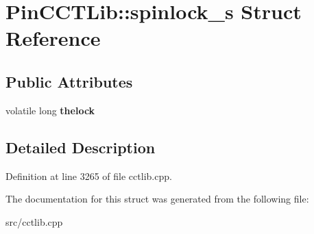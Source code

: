 \hypertarget{structPinCCTLib_1_1spinlock__s}{\section{Pin\-C\-C\-T\-Lib\-:\-:spinlock\-\_\-s Struct Reference}
\label{structPinCCTLib_1_1spinlock__s}
}
\subsection*{Public Attributes}
\begin{DoxyCompactItemize}
\item 
\hypertarget{structPinCCTLib_1_1spinlock__s_a936f0a8cd1abcbadaef8a69755c107bd}{volatile long {\bfseries thelock}}\label{structPinCCTLib_1_1spinlock__s_a936f0a8cd1abcbadaef8a69755c107bd}

\end{DoxyCompactItemize}


\subsection{Detailed Description}


Definition at line 3265 of file cctlib.\-cpp.



The documentation for this struct was generated from the following file\-:\begin{DoxyCompactItemize}
\item 
src/cctlib.\-cpp\end{DoxyCompactItemize}
